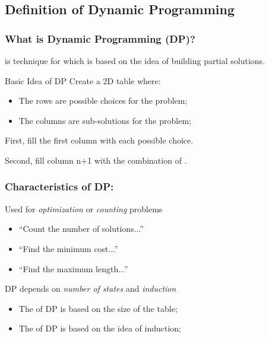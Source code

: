 \documentclass{beamer}
\begin{document}
\subsection{Definition of Dynamic Programming}
\begin{frame}
  \frametitle{What is Dynamic Programming (DP)?}

   is technique for  which is
  based on the idea of \alert{building partial solutions}.

  \bigskip

  \begin{block}{Basic Idea of DP}
    Create a 2D table where:
    \begin{itemize}
    \item The rows are possible choices for the problem;
    \item The columns are sub-solutions for the problem;
    \end{itemize}

    \medskip
    First, fill the first column with each possible choice.\\

    \medskip
    
    Second, fill column n+1 with the combination of .
  \end{block}
\end{frame}

\begin{frame}
  \frametitle{Characteristics of DP:}

  \begin{block}{Used for \emph{optimization} or \emph{counting} problems}
    \begin{itemize}
    \item ``Count the number of solutions...''
    \item ``Find the minimum cost...''
    \item ``Find the maximum length...''
    \end{itemize}
  \end{block}

  \begin{exampleblock}{DP depends on \emph{number of states} and \emph{induction}}
      \begin{itemize}
      \item The  of DP is based on the size of the table;
      \item The  of DP is based on the idea of induction;
      \end{itemize}
  \end{exampleblock}  
\end{frame}
\end{document}
